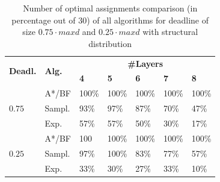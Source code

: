 \documentclass[letterpaper]{article} %
\newcommand{\astar}{\textsc{A*}\xspace}
\begin{document}
\begin{table}[]
\centering
\small
\begin{tabular}{|l|l|l|l|l|l|l|}
\hline
\multirow{2}{*}{\textbf{Deadl.}} & \multirow{2}{*}{\textbf{Alg.}} & \multicolumn{5}{c|}{\textbf{\#Layers}}                         \\ \cline{3-7} 
                                   &                                     & \textbf{4} & \textbf{5} & \textbf{6} & \textbf{7} & \textbf{8} \\ \hline
\multirow{3}{*}{$0.75$}  & \astar/BF                                  & 100\%         & 100\%         & 100\%         & 100\%         & 100\%         \\ \cline{2-7} 
                                   & Sampl.                            & 93\%         & 97\%         & 87\%         & 70\%         & 47\%         \\ \cline{2-7} 
                                   & Exp.                         & 57\%         & 57\%         & 50\%         & 30\%          & 17\%          \\ \hline
\multirow{3}{*}{$0.25$}  & \astar/BF                                  & 100         & 100\%         & 100\%         & 100\%         & 100\%         \\ \cline{2-7} 
                                   & Sampl.                            & 97\%         & 100\%         & 83\%         & 77\%         & 57\%         \\ \cline{2-7} 
                                   & Exp.                         & 33\%         & 30\%          & 27\%          & 33\%         & 10\%          \\ \hline
\end{tabular}
\caption{Number of optimal assignments comparison (in percentage out of 30) of all algorithms for deadline of size $0.75\cdot maxd$ and $0.25\cdot maxd$ with structural distribution}\label{tableOptAssgn}
\end{table}
\end{document}
